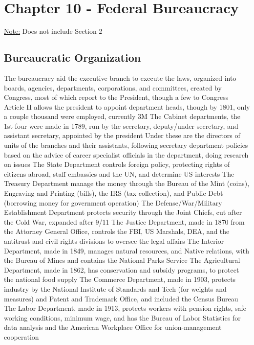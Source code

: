 \documentclass[11 pt, twoside]{article}
\newenvironment{outline*}
{
	\begin{outline}[enumerate]
	}
	{\end{outline}
}
\begin{document}
\section{Chapter 10 - Federal Bureaucracy}
\underline{Note:} Does not include Section 2
\subsection{Bureaucratic Organization}
\begin{outline*}
\1 The bureaucracy aid the executive branch to execute the laws, organized into boards, agencies, departments, corporations, and committees, created by Congress, most of which report to the President, though a few to Congress
\2 Article II allows the president to appoint department heads, though by 1801, only a couple thousand were employed, currently 3M
\1 The Cabinet departments, the 1st four were made in 1789, run by the secretary, deputy/under secretary, and assistant secretary, appointed by the president
\2 Under these are the directors of units of the branches and their assistants, following secretary department policies based on the advice of career specialist officials in the department, doing research on issues
\2 The State Department controls foreign policy, protecting rights of citizens abroad, staff embassies and the UN, and determine US interests
\2 The Treasury Department manage the money through the Bureau of the Mint (coins), Engraving and Printing (bills), the IRS (tax collection), and Public Debt (borrowing money for government operation)
\2 The Defense/War/Military Establishment Department protects security through the Joint Chiefs, cut after the Cold War, expanded after 9/11
\2 The Justice Department, made in 1870 from the Attorney General Office, controls the FBI, US Marshals, DEA, and the antitrust and civil rights divisions to oversee the legal affairs
\2 The Interior Department, made in 1849, manages natural resources, and Native relations, with the Bureau of Mines and contains the National Parks Service
\2 The Agricultural Department, made in 1862, has conservation and subsidy programs, to protect the national food supply
\2 The Commerce Department, made in 1903, protects industry by the National Institute of Standards and Tech (for weights and measures) and Patent and Trademark Office, and included the Census Bureau
\2 The Labor Department, made in 1913, protects workers with pension rights, safe working conditions, minimum wage, and has the Bureau of Labor Statistics for data analysis and the American Workplace Office for union-management cooperation

\end{outline*}
\end{document}
